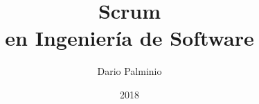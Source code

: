 
\title{\Huge 
    \textbf{Scrum}  \\ 
    \huge en Ingeniería de Software
    }

\author{Dario Palminio}

\date{2018} 

\maketitle
